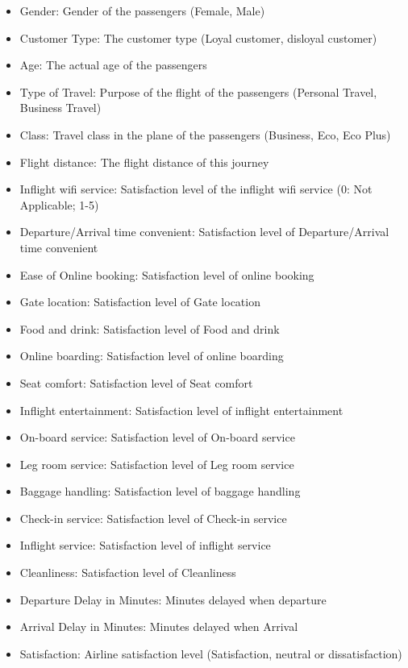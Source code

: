 \documentclass[
]{article}
\providecommand{\tightlist}{%
  \setlength{\itemsep}{0pt}\setlength{\parskip}{0pt}}
\begin{document}
\begin{itemize}
\tightlist
\item
  Gender: Gender of the passengers (Female, Male)
\item
  Customer Type: The customer type (Loyal customer, disloyal customer)
\item
  Age: The actual age of the passengers
\item
  Type of Travel: Purpose of the flight of the passengers (Personal
  Travel, Business Travel)
\item
  Class: Travel class in the plane of the passengers (Business, Eco, Eco
  Plus)
\item
  Flight distance: The flight distance of this journey
\item
  Inflight wifi service: Satisfaction level of the inflight wifi service
  (0: Not Applicable; 1-5)
\item
  Departure/Arrival time convenient: Satisfaction level of
  Departure/Arrival time convenient
\item
  Ease of Online booking: Satisfaction level of online booking
\item
  Gate location: Satisfaction level of Gate location
\item
  Food and drink: Satisfaction level of Food and drink
\item
  Online boarding: Satisfaction level of online boarding
\item
  Seat comfort: Satisfaction level of Seat comfort
\item
  Inflight entertainment: Satisfaction level of inflight entertainment
\item
  On-board service: Satisfaction level of On-board service
\item
  Leg room service: Satisfaction level of Leg room service
\item
  Baggage handling: Satisfaction level of baggage handling
\item
  Check-in service: Satisfaction level of Check-in service
\item
  Inflight service: Satisfaction level of inflight service
\item
  Cleanliness: Satisfaction level of Cleanliness
\item
  Departure Delay in Minutes: Minutes delayed when departure
\item
  Arrival Delay in Minutes: Minutes delayed when Arrival
\item
  Satisfaction: Airline satisfaction level (Satisfaction, neutral or
  dissatisfaction)
\end{itemize}
\end{document}
